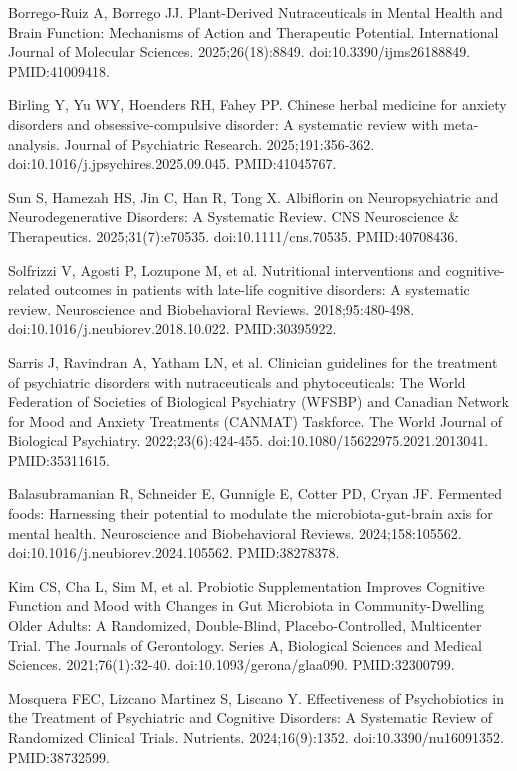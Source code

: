\documentclass[12pt,oneside]{book}
\newcommand{\reff}[2]{\par\hangindent=7mm\hangafter=1\noindent[#1]\hspace{2mm}#2\par}
\begin{document}
\reff{51}{Borrego-Ruiz A, Borrego JJ. Plant-Derived Nutraceuticals in Mental Health and Brain Function: Mechanisms of Action and Therapeutic Potential. International Journal of Molecular Sciences. 2025;26(18):8849. doi:10.3390/ijms26188849. PMID:41009418.}

\reff{52}{Birling Y, Yu WY, Hoenders RH, Fahey PP. Chinese herbal medicine for anxiety disorders and obsessive-compulsive disorder: A systematic review with meta-analysis. Journal of Psychiatric Research. 2025;191:356-362. doi:10.1016/j.jpsychires.2025.09.045. PMID:41045767.}

\reff{53}{Sun S, Hamezah HS, Jin C, Han R, Tong X. Albiflorin on Neuropsychiatric and Neurodegenerative Disorders: A Systematic Review. CNS Neuroscience \& Therapeutics. 2025;31(7):e70535. doi:10.1111/cns.70535. PMID:40708436.}

\reff{54}{Solfrizzi V, Agosti P, Lozupone M, et al. Nutritional interventions and cognitive-related outcomes in patients with late-life cognitive disorders: A systematic review. Neuroscience and Biobehavioral Reviews. 2018;95:480-498. doi:10.1016/j.neubiorev.2018.10.022. PMID:30395922.}

\reff{55}{Sarris J, Ravindran A, Yatham LN, et al. Clinician guidelines for the treatment of psychiatric disorders with nutraceuticals and phytoceuticals: The World Federation of Societies of Biological Psychiatry (WFSBP) and Canadian Network for Mood and Anxiety Treatments (CANMAT) Taskforce. The World Journal of Biological Psychiatry. 2022;23(6):424-455. doi:10.1080/15622975.2021.2013041. PMID:35311615.}

\reff{56}{Balasubramanian R, Schneider E, Gunnigle E, Cotter PD, Cryan JF. Fermented foods: Harnessing their potential to modulate the microbiota-gut-brain axis for mental health. Neuroscience and Biobehavioral Reviews. 2024;158:105562. doi:10.1016/j.neubiorev.2024.105562. PMID:38278378.}

\reff{57}{Kim CS, Cha L, Sim M, et al. Probiotic Supplementation Improves Cognitive Function and Mood with Changes in Gut Microbiota in Community-Dwelling Older Adults: A Randomized, Double-Blind, Placebo-Controlled, Multicenter Trial. The Journals of Gerontology. Series A, Biological Sciences and Medical Sciences. 2021;76(1):32-40. doi:10.1093/gerona/glaa090. PMID:32300799.}

\reff{58}{Mosquera FEC, Lizcano Martinez S, Liscano Y. Effectiveness of Psychobiotics in the Treatment of Psychiatric and Cognitive Disorders: A Systematic Review of Randomized Clinical Trials. Nutrients. 2024;16(9):1352. doi:10.3390/nu16091352. PMID:38732599.}
\end{document}
